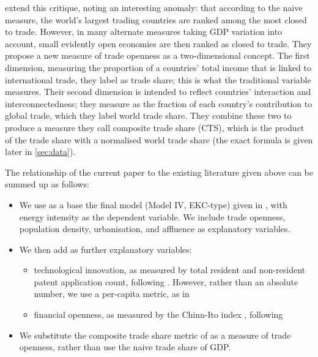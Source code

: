 \documentclass[12pt,a4paper]{article}
\begin{document}
\cite{squalliNewMeasureTrade2011} extend this critique, noting an interesting anomaly: that according to the naive measure, the world’s largest trading countries are ranked among the most closed to trade.
However, in many alternate measures taking GDP variation into account, small evidently open economies are then ranked as closed to trade.
They propose a new measure of trade openness as a two-dimensional concept.
The first dimension, measuring the proportion of a countries' total income that is linked to international trade, they label as trade share; this is what the traditional variable measures.
Their second dimension is intended to reflect countries' interaction and interconnectedness; they measure as the fraction of each country's contribution to global trade, which they label world trade share.
They combine these two to produce a measure they call composite trade share (CTS), which is the product of the trade share with a normalised world trade share (the exact formula is given later in \cref{sec:data}).

The relationship of the current paper to the existing literature given above can be summed up as follows: 
\begin{itemize}
\item We use as a base the final model (Model IV, EKC-type) given in \cite{rafiqUrbanizationOpennessEmissions2016}, with energy intensity as the dependent variable. We include trade openness, population density, urbanisation, and affluence as explanatory variables.
\item We then add as further explanatory variables:
\begin{itemize}
\item technological innovation, as measured by total resident and non-resident patent application count, following \cite{panHowIndustrializationTrade2019}. 
However, rather than an absolute number, we use a per-capita metric, as in \cite{maradanaDoesInnovationPromote2017}
\item financial openness, as measured by the Chinn-Ito index \citep{chinnWhatMattersFinancial2006}, following \cite{koengkanPositiveImpactTrade2018}
\end{itemize}
\item We substitute the composite trade share metric of \cite{squalliNewMeasureTrade2011} as a measure of trade openness, rather than use the naive trade share of GDP.
\end{itemize}
\end{document}
